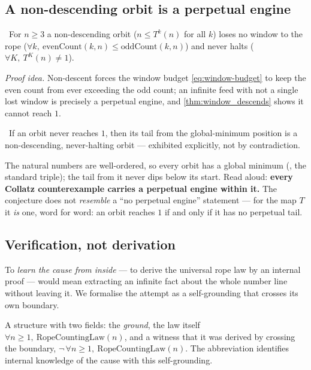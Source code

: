 \subsection{A non-descending orbit is a perpetual engine}

\begin{theorem}\label{thm:nonDescendingOrbit_is_perpetual_engine}
\green{}\ For $n\ge 3$ a non-descending orbit ($n\le T^{k}(n)$ for all $k$) loses no window to the rope
($\forall k,\ \mathrm{evenCount}(k,n)\le\mathrm{oddCount}(k,n)$) and never halts
($\forall K,\ T^{K}(n)\neq 1$). 
\end{theorem}

\emph{Proof idea.} Non-descent forces the window budget \cref{eq:window-budget} to keep the even
count from ever exceeding the odd count; an infinite feed with not a single lost window is precisely a
perpetual engine, and \cref{thm:window_descends} shows it cannot reach $1$.

\begin{theorem}\label{thm:nonHalting_carries_perpetual_engine}
\green{}\ If an orbit never reaches $1$, then its tail from the global-minimum position is a non-descending,
never-halting orbit --- exhibited explicitly, not by contradiction.
\end{theorem}

The natural numbers are well-ordered, so every orbit has a global minimum
(, the standard triple); the tail from it never dips below its start.
Read aloud: \textbf{every Collatz counterexample carries a perpetual engine within it.} The
conjecture does not \emph{resemble} a ``no perpetual engine'' statement --- for the map $T$ it
\emph{is} one, word for word: an orbit reaches $1$ if and only if it has no perpetual tail.

\subsection{Verification, not derivation}

To \emph{learn the cause from inside} --- to derive the universal rope law by an internal proof ---
would mean extracting an infinite fact about the whole number line without leaving it. We formalise
the attempt as a self-grounding that crosses its own boundary.

\begin{definition}\label{def:internalisedCollatzGround}
A structure with two fields: the \emph{ground}, the law itself $\forall n\ge 1,\ \mathrm{RopeCountingLaw}(n)$,
and a witness that it was derived by crossing the boundary,
$\neg\,\forall n\ge 1,\ \mathrm{RopeCountingLaw}(n)$. The abbreviation
 identifies internal knowledge of the cause with this
self-grounding. 
\end{definition}

